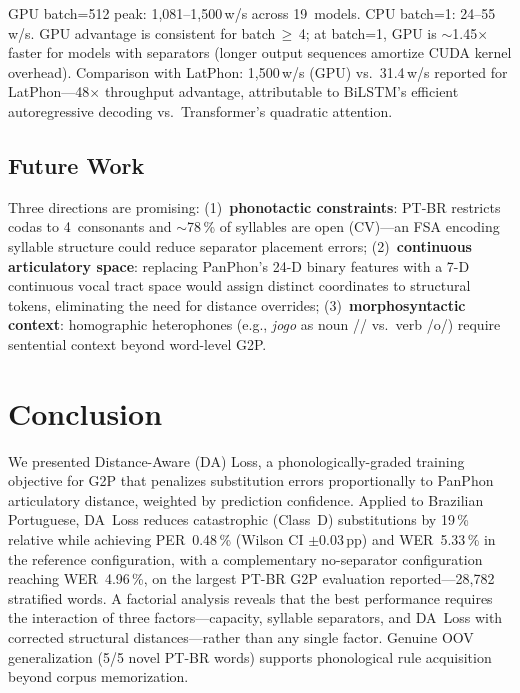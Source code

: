 \documentclass[conference]{IEEEtran}
\begin{document}
GPU batch=512 peak: 1{,}081--1{,}500\,w/s across 19~models.
CPU batch=1: 24--55\,w/s.
GPU advantage is consistent for batch$\,\geq\,$4;
at batch=1, GPU is $\sim$1.45$\times$ faster for models with
separators (longer output sequences amortize CUDA kernel overhead).
Comparison with LatPhon: 1{,}500\,w/s (GPU) vs.\
31.4\,w/s reported for LatPhon---48$\times$ throughput advantage,
attributable to BiLSTM's efficient autoregressive decoding vs.\
Transformer's quadratic attention.

\subsection{Future Work}

Three directions are promising:
(1)~\textbf{phonotactic constraints}: PT-BR restricts codas to
4~consonants and $\sim$78\,\% of syllables are open (CV)---an FSA
encoding syllable structure could reduce separator placement errors;
(2)~\textbf{continuous articulatory space}: replacing PanPhon's
24-D binary features with a 7-D continuous vocal tract space would
assign distinct coordinates to structural tokens, eliminating the
need for distance overrides;
(3)~\textbf{morphosyntactic context}: homographic heterophones
(e.g., \textit{jogo} as noun // vs.\ verb /o/) require
sentential context beyond word-level G2P.

\section{Conclusion}

We presented Distance-Aware (DA) Loss, a phonologically-graded
training objective for G2P that penalizes substitution errors
proportionally to PanPhon articulatory distance, weighted by
prediction confidence.
Applied to Brazilian Portuguese, DA~Loss reduces catastrophic
(Class~D) substitutions by 19\,\% relative while achieving
PER~0.48\,\% (Wilson CI $\pm$0.03\,pp) and WER~5.33\,\% in the
reference configuration, with a complementary no-separator
configuration reaching WER~4.96\,\%, on the largest PT-BR G2P
evaluation reported---28{,}782 stratified words.
A factorial analysis reveals that the best performance requires
the interaction of three factors---capacity, syllable separators,
and DA~Loss with corrected structural distances---rather than any
single factor.
Genuine OOV generalization (5/5 novel PT-BR words) supports
phonological rule acquisition beyond corpus memorization.
\end{document}
